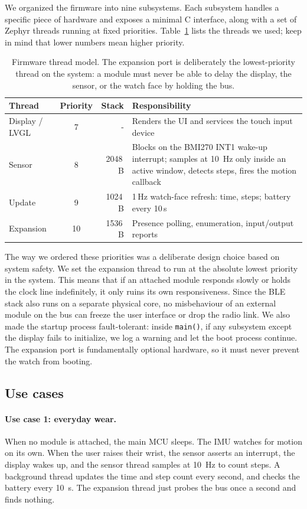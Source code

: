 \documentclass[12pt, a4paper]{article}
\begin{document}
We organized the firmware into nine subsystems. Each subsystem handles a specific piece of hardware and exposes a minimal C interface, along with a set of Zephyr threads running at fixed priorities. Table~\ref{tab:threads} lists the threads we used; keep in mind that lower numbers mean higher priority.

\begin{table}[H]
\centering
\small
\begin{tabular}{@{}l c r p{7.2cm}@{}}
\toprule
\textbf{Thread} & \textbf{Priority} & \textbf{Stack} & \textbf{Responsibility} \\
\midrule
Display / LVGL & 7 & - & Renders the UI and services the touch input device \\
Sensor & 8 & 2048\,B & Blocks on the BMI270 INT1 wake-up interrupt; samples at \SI{10}{\hertz} only inside an active window, detects steps, fires the motion callback \\
Update & 9 & 1024\,B & 1\,Hz watch-face refresh: time, steps; battery every 10\,s \\
Expansion & 10 & 1536\,B & Presence polling, enumeration, input/output reports \\
\bottomrule
\end{tabular}
\caption{Firmware thread model. The expansion port is deliberately the lowest-priority thread on the system: a module must never be able to delay the display, the sensor, or the watch face by holding the bus.}
\label{tab:threads}
\end{table}
The way we ordered these priorities was a deliberate design choice based on system safety. We set the expansion thread to run at the absolute lowest priority in the system. This means that if an attached module responds slowly or holds the clock line indefinitely, it only ruins its own responsiveness. Since the BLE stack also runs on a separate physical core, no misbehaviour of an external module on the bus can freeze the user interface or drop the radio link. We also made the startup process fault-tolerant: inside \texttt{main()}, if any subsystem except the display fails to initialize, we log a warning and let the boot process continue. The expansion port is fundamentally optional hardware, so it must never prevent the watch from booting.

\subsection{Use cases}

\paragraph{Use case 1: everyday wear.} When no module is attached, the main MCU sleeps. The IMU watches for motion on its own. When the user raises their wrist, the sensor asserts an interrupt, the display wakes up, and the sensor thread samples at \SI{10}{\hertz} to count steps. A background thread updates the time and step count every second, and checks the battery every \SI{10}{\second}. The expansion thread just probes the  bus once a second and finds nothing.
\end{document}
